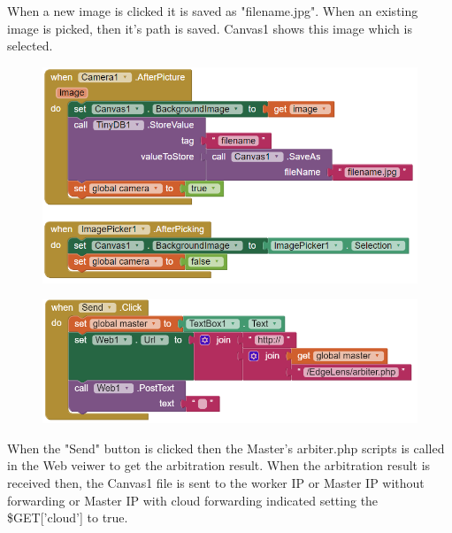 \documentclass{article}
\begin{document}
When a new image is clicked it is saved as "filename.jpg". When an existing image is picked, then it's path is saved. Canvas1 shows this image which is selected.
\begin{figure}[h]
\centering %
\includegraphics[width=\textwidth]{2.PNG}
\end{figure}


\begin{figure}[h]
\centering %
\includegraphics[width=\textwidth]{2-5.PNG}
\end{figure}

When the "Send" button is clicked then the Master's arbiter.php scripts is called in the Web veiwer to get the arbitration result. When the arbitration result is received then, the Canvas1 file is sent to the worker IP or Master IP without forwarding or Master IP with cloud forwarding indicated setting the \$GET['cloud'] to true.\\
\end{document}
